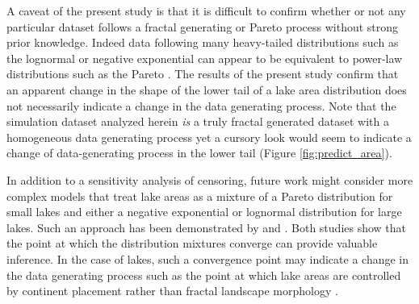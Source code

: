 \documentclass{article}
\begin{document}
A caveat of the present study is that it is difficult to confirm whether or not any particular dataset follows a fractal generating or Pareto process without strong prior knowledge. Indeed data following many heavy-tailed distributions such as the lognormal or negative exponential can appear to be equivalent to power-law distributions such as the Pareto \citep{clausetPowerlawDistributionsEmpirical2009}. The results of the present study confirm that an apparent change in the shape of the lower tail of a lake area distribution does not necessarily indicate a change in the data generating process. Note that the simulation dataset analyzed herein \emph{is} a truly fractal generated dataset with a homogeneous data generating process yet a cursory look would seem to indicate a change of data-generating process in the lower tail (Figure \ref{fig:predict_area}).

In addition to a sensitivity analysis of censoring, future work might consider more complex models that treat lake areas as a mixture of a Pareto distribution for small lakes and either a negative exponential or lognormal distribution for large lakes. Such an approach has been demonstrated by \citet{bonabeau_scaling_1999-1} and \citet{scollnikCompositeLognormalParetoModels2007}. Both studies show that the point at which the distribution mixtures converge can provide valuable inference. In the case of lakes, such a convergence point may indicate a change in the data generating process such as the point at which lake areas are controlled by continent placement rather than fractal landscape morphology \citep{goodchildLakesFractalSurfaces1988, hamiltonEstimationFractalDimension1992}.



\end{document}

